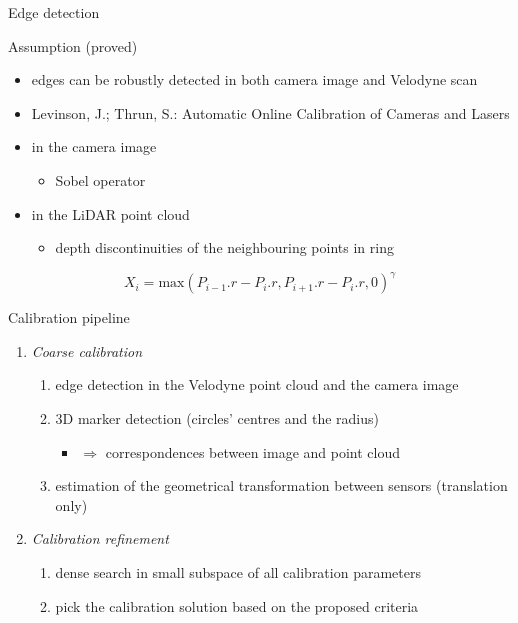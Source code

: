 \documentclass[pdf]{beamer}
\begin{document}
	\begin{frame}{Edge detection}
		\begin{alertblock}{Assumption (proved)}		
		\begin{itemize}
			\item edges can be robustly detected in both camera image and Velodyne scan
			\item \scriptsize{Levinson, J.; Thrun, S.: Automatic Online Calibration of Cameras and Lasers}
		\end{itemize}
		\end{alertblock}
		
		\begin{itemize}
			\item in the camera image
			\begin{itemize}
				\item Sobel operator
			\end{itemize}
			\item in the LiDAR point cloud
			\begin{itemize}
			 	\item depth discontinuities of the neighbouring points in ring
			\end{itemize}
		\end{itemize}
			\begin{equation}
				X_i = \mbox{max}(P_{i-1}.r - P_i.r, P_{i+1}.r - P_i.r, 0)^\gamma
			\end{equation}
	\end{frame}

	\begin{frame}{Calibration pipeline}
		\begin{enumerate}
			\item \emph{Coarse calibration}
			\begin{enumerate}
				\item edge detection in the Velodyne point cloud and the camera image
				\item $3$D marker detection (circles' centres and the radius)
				\begin{itemize}
					\item $\Rightarrow$ correspondences between image and point cloud
				\end{itemize}
				\item estimation of the geometrical transformation between sensors (translation only)
			\end{enumerate}
			\item \emph{Calibration refinement}
			\begin{enumerate}
				\item dense search in small subspace of all calibration parameters
				\item pick the calibration solution based on the proposed criteria
			\end{enumerate}
		\end{enumerate}
	\end{frame}
\end{document}
